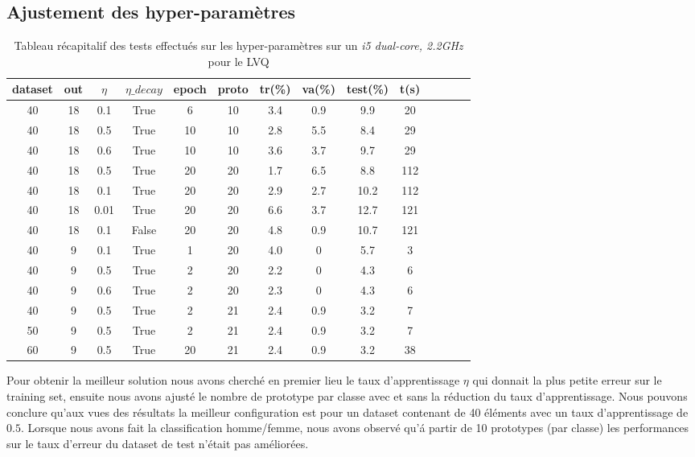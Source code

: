 \documentclass[11pt]{article}
\begin{document}
\newpage
\subsection{Ajustement des hyper-param\`etres}
\begin{table}[h]
	\centering
	\begin{tabular}{|c|c|c|c|c|c|c|c|c|c|c|c|c|c|}
		\hline
		dataset & out  & $\eta$ & $\eta\_decay$ & epoch  & proto  & tr(\%) & va(\%) & test(\%) & t(s)\\
		\hline		
		40	& 18 & 0.1 & True & 6 & 10 & 3.4 & 0.9 & 9.9 & 20\\
		\hline
		\rowcolor{green}		
		40	& 18 & 0.5 & True & 10 & 10 & 2.8 & 5.5 & 8.4 & 29\\
		\hline		
		40	& 18 & 0.6 & True & 10 & 10 & 3.6 & 3.7 & 9.7 & 29\\
		\hline		
		40	& 18 & 0.5 & True & 20 & 20 & 1.7 & 6.5 & 8.8 & 112\\
		\hline		
		40	& 18 & 0.1 & True & 20 & 20 & 2.9 & 2.7 & 10.2 & 112\\
		\hline		
		40	& 18 & 0.01 & True & 20 & 20 & 6.6 & 3.7 & 12.7 & 121\\
		\hline		
		40	& 18 & 0.1 & False & 20 & 20 & 4.8 & 0.9 & 10.7 & 121\\
		\hline		
		40	& 9 & 0.1 & True & 1 & 20 & 4.0 & 0 & 5.7 & 3\\
		\hline		
		40	& 9 & 0.5 & True & 2 & 20 & 2.2 & 0 & 4.3 & 6\\
		\hline
		40	& 9 & 0.6 & True & 2 & 20 & 2.3 & 0 & 4.3 & 6\\
		\hline
		\rowcolor{green}
		40	& 9 & 0.5 & True & 2 & 21 & 2.4 & 0.9 & 3.2 & 7\\
		\hline
		50  & 9 & 0.5 & True & 2 & 21 & 2.4 & 0.9 & 3.2 & 7\\
		\hline
		60  & 9 & 0.5 & True & 20 & 21 & 2.4 & 0.9 & 3.2 & 38\\
		\hline
\end{tabular}
  \caption{Tableau r\'ecapitalif des tests effectu\'es sur les
	hyper-param\`etres sur un {\em i5 dual-core, 2.2GHz} pour le LVQ }
\end{table}


Pour obtenir la meilleur solution nous avons cherch\'e en premier lieu le
taux d'apprentissage $\eta$  qui donnait la plus petite erreur sur le training
set, ensuite nous avons ajust\'e le nombre de prototype par classe avec et sans
la r\'eduction du taux d'apprentissage. Nous pouvons conclure qu'aux vues des
r\'esultats la meilleur configuration est pour un dataset contenant de 40
\'el\'ements avec un taux d'apprentissage de $0.5$.
Lorsque nous avons fait la classification homme/femme, nous avons observ\'e
qu'\'a partir de 10 prototypes (par classe) les performances sur le taux
d'erreur du dataset de test n'\'etait pas am\'elior\'ees.
\end{document}
